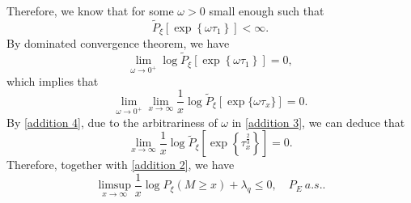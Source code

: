 \documentclass[]{article}
\numberwithin{equation}{section}
\theoremstyle{thmstyleone}%
\theoremstyle{thmstyletwo}%
\theoremstyle{thmstylethree}%
\theoremstyle{thmstylefour}%
\theoremstyle{thmstylefive}%
\theoremstyle{thmstylesix}%
\begin{document}
	Therefore, we know that for some $\omega>0$ small enough such that
	\begin{equation*}
		\tilde{P}_\xi 
		\left[ 
		\exp\left\{\omega \tau_1\right\}\right]<\infty.
	\end{equation*}
	By dominated convergence theorem, we have
	\begin{equation*} 
		\lim\limits_{\omega\rightarrow 0^+}  \log \tilde{P}_\xi 
		\left[ 
		\exp\left\{\omega \tau_1\right\}\right] = 0,
	\end{equation*}
	which implies that
	\begin{equation} \label{addition 4}
		\lim\limits_{\omega\rightarrow 0^+} \lim\limits_{x\rightarrow\infty}\frac{1}{x}\log \tilde{P}_\xi 
		\left[
		\exp\{\omega \tau_x\}\right] = 0.
	\end{equation}
	By \cref{addition 4}, due to the arbitrariness of $\omega$ in \cref{addition 3}, we can deduce that
	\begin{equation}
		\lim\limits_{x\rightarrow\infty} \frac{1}{x}\log\tilde{P}_\xi 
		\left[
		\exp\left\{\tau_x^{\frac{2}{3}}\right\}
		\right] =0.
	\end{equation}
	Therefore, together with \cref{addition 2}, we have
	\begin{equation}\label{addition 10}
		\limsup\limits_{x\rightarrow\infty}\frac{1}{x}\log P_\xi(M\geqslant x)+\lambda_q \leqslant 0, \quad P_E~a.s..
	\end{equation}
	
\end{document}
